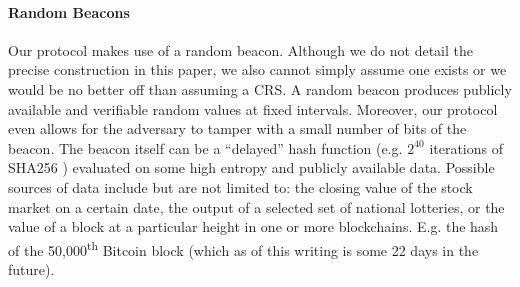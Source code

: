 \documentclass{article}
\begin{document}




\paragraph*{Random Beacons} Our  protocol makes use of a random beacon. Although we do not detail the precise construction in this paper,  we also cannot simply assume one exists or we would be no better off than assuming a CRS. A random beacon produces publicly available and verifiable random values at fixed intervals.  Moreover, our protocol even allows for the adversary to tamper with a small number of bits of the beacon. The beacon itself can be a ``delayed'' hash function \cite{BGB17} (e.g. $2^{40}$ iterations of SHA256 \cite{Bonneau} ) evaluated on some high entropy and publicly available data. Possible sources of data  include but are not limited to: the closing value of the stock market on a certain date, the output of a selected set of national lotteries, or the value of a block at a particular height in one or more blockchains. E.g. the hash of the 50,000\textsuperscript{th} Bitcoin block (which as of this writing is some 22 days in the future). 
\end{document}
